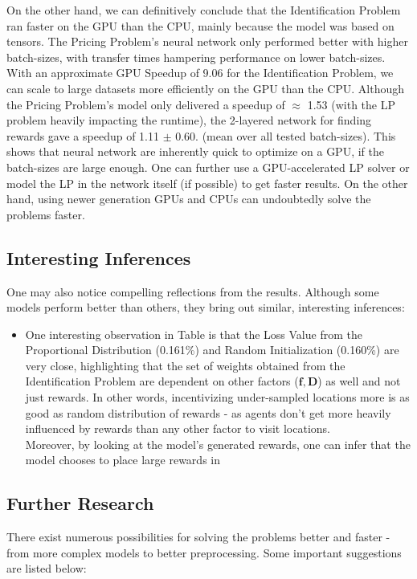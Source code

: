 \documentclass[12pt]{article}
\newcommand{\matr}[1]{\mathbf{#1}}  %
\begin{document}
    On the other hand, we can definitively conclude that the Identification Problem ran faster on the GPU than the CPU, mainly because the model was based on tensors. The Pricing Problem's neural network only performed better with higher batch-sizes, with transfer times hampering performance on lower batch-sizes. With an approximate GPU Speedup of 9.06 for the Identification Problem, we can scale to large datasets more efficiently on the GPU than the CPU. Although the Pricing Problem's model only delivered a speedup of $\approx$ 1.53 (with the LP problem heavily impacting the runtime), the 2-layered network for finding rewards gave a speedup of 1.11 $\pm$ 0.60. (mean over all tested batch-sizes). This shows that neural network are inherently quick to optimize on a GPU, if the batch-sizes are large enough. One can further use a GPU-accelerated LP solver or model the LP in the network itself (if possible) to get faster results. On the other hand, using newer generation GPUs and CPUs can undoubtedly solve the problems faster.
    
    \subsection{Interesting Inferences}
    One may also notice compelling reflections from the results. Although some models perform better than others, they bring out similar, interesting inferences:
    \begin{itemize}
        \item One interesting observation in Table  is that the Loss Value from the Proportional Distribution (0.161\%) and Random Initialization (0.160\%) are very close, highlighting that the set of weights obtained from the Identification Problem are dependent on other factors ($\matr{f}, \matr{D}$) as well and not just rewards. In other words, incentivizing under-sampled locations more is as good as random distribution of rewards - as agents don't get more heavily influenced by rewards than any other factor to visit locations.\\
        Moreover, by looking at the model's generated rewards, one can infer that the model chooses to place large rewards in 
    \end{itemize}

    \subsection{Further Research}
    There exist numerous possibilities for solving the problems better and faster - from more complex models to better preprocessing. Some important suggestions are listed below:
    
\end{document}
